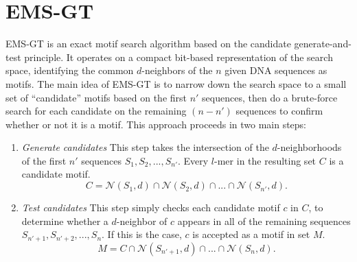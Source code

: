 \documentclass[oneside,12pt]{DISCSthesis}
\begin{document}
	\section{EMS-GT}
		EMS-GT \cite{nabos2015dissertation} is an exact motif search algorithm based on the candidate generate-and-test principle.
		It operates on a compact bit-based representation of the search space, identifying the common $d$-neighbors of the $n$ given DNA sequences as motifs. The main idea of EMS-GT is to narrow down the search space to a small set of ``candidate'' motifs based on the first $n'$ sequences, then do a brute-force search for each candidate on the remaining $(n - n')$ sequences to confirm whether or not it is a motif. This approach proceeds in two main steps:
		\begin{enumerate} %
			\item {\em Generate candidates}\newline
			This step takes the intersection of the $d$-neighborhoods of the first $n'$ sequences $S_{1},S_{2},...,S_{n'}$. Every $l$-mer in the resulting set $C$ is a candidate motif.
				\begin{equation} C = \mathcal{N}(S_{1}, d) \cap \mathcal{N}(S_{2}, d) \cap...\cap \mathcal{N}(S_{n'}, d). \end{equation}
			\item {\em Test candidates}\newline
			This step simply checks each candidate motif $c$ in $C$, to determine whether a $d$-neighbor of $c$ appears in all of the remaining sequences $S_{n'+1},S_{n'+2},...,S_{n}$. If this is the case, $c$ is accepted as a motif in set $M$.
				\begin{equation} M = C \cap \mathcal{N}(S_{n'+1}, d) \cap...\cap \mathcal{N}(S_{n}, d). \end{equation}
			\end{enumerate}


		
\end{document}
